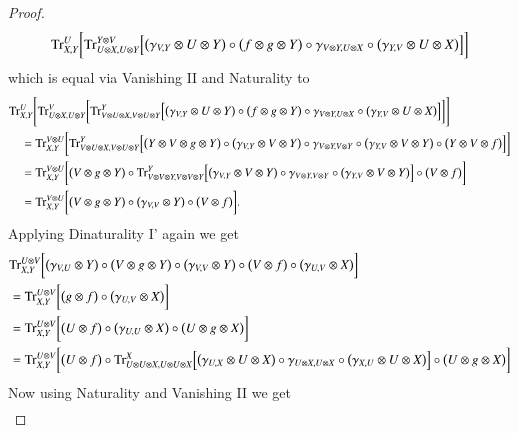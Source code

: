 \documentclass{amsart}
\def\tn{\textnormal}
\def\Trace{\tn{Tr}}
\theoremstyle{remark}
\theoremstyle{definition}
\begin{document}
\begin{proof}
{ \[\Trace^U_{X,Y}\bigg[\Trace^{Y\otimes V}_{U\otimes X,U\otimes Y}\Big[\big(\gamma_{V,Y}\otimes U\otimes Y\big)\circ\big(f\otimes g\otimes Y\big)\circ\gamma_{V\otimes Y,U\otimes X}\circ\big(\gamma_{Y,V}\otimes U\otimes X\big)\Big]\bigg]\]
 which is equal via Vanishing II and Naturality to
 \begin{align*}
  &\Trace^U_{X,Y}\Bigg[\Trace^V_{U\otimes X,U\otimes Y}\bigg[\Trace^Y_{V\otimes U\otimes X,V\otimes U\otimes Y}\Big[\big(\gamma_{V,Y}\otimes U\otimes Y\big)\circ\big(f\otimes g\otimes Y\big)\circ\gamma_{V\otimes Y,U\otimes X}\circ\big(\gamma_{Y,V}\otimes U\otimes X\big)\Big]\bigg]\Bigg]\\
  &\quad=\Trace^{V\otimes U}_{X,Y}\bigg[\Trace^Y_{V\otimes U\otimes X,V\otimes U\otimes Y}\Big[\big(Y\otimes V\otimes g\otimes Y\big)\circ\big(\gamma_{V,Y}\otimes V\otimes Y\big)\circ\gamma_{V\otimes Y,V\otimes Y}\circ\big(\gamma_{Y,V}\otimes V\otimes Y\big)\circ\big(Y\otimes V\otimes f\big)\Big]\bigg]\\
  &\quad=\Trace^{V\otimes U}_{X,Y}\bigg[\big(V\otimes g\otimes Y\big)\circ\Trace^Y_{V\otimes V\otimes Y,V\otimes V\otimes Y}\Big[\big(\gamma_{V,Y}\otimes V\otimes Y\big)\circ\gamma_{V\otimes Y,V\otimes Y}\circ\big(\gamma_{Y,V}\otimes V\otimes Y\big)\Big]\circ\big(V\otimes f\big)\bigg]\\
  &\quad=\Trace^{V\otimes U}_{X,Y}\bigg[\big(V\otimes g\otimes Y\big)\circ\big(\gamma_{V,V}\otimes Y\big)\circ\big(V\otimes f\big)\bigg].
 \end{align*}
 Applying Dinaturality I' again we get
 \begin{align*}
  &\Trace^{U\otimes V}_{X,Y}\bigg[\big(\gamma_{V,U}\otimes Y\big)\circ\big(V\otimes g\otimes Y\big)\circ\big(\gamma_{V,V}\otimes Y\big)\circ\big(V\otimes f\big)\circ\big(\gamma_{U,V}\otimes X\big)\bigg]\\
  &=\Trace^{U\otimes V}_{X,Y}\bigg[\big(g\otimes f\big)\circ\big(\gamma_{U,V}\otimes X\big)\bigg]\\
  &=\Trace^{U\otimes V}_{X,Y}\bigg[\big(U\otimes f\big)\circ\big(\gamma_{U,U}\otimes X\big)\circ\big(U\otimes g\otimes X\big)\bigg]\\
  &=\Trace^{U\otimes V}_{X,Y}\bigg[\big(U\otimes f\big)\circ\Trace^X_{U\otimes U\otimes X,U\otimes U\otimes X}\Big[\big(\gamma_{U,X}\otimes U\otimes X\big)\circ\gamma_{U\otimes X, U\otimes X}\circ\big(\gamma_{X,U}\otimes U\otimes X\big)\Big]\circ\big(U\otimes g\otimes X\big)\bigg]
 \end{align*}
 Now using Naturality and Vanishing II we get
 \begin{align*}

\end{align*}}
\end{proof}
\end{document}

